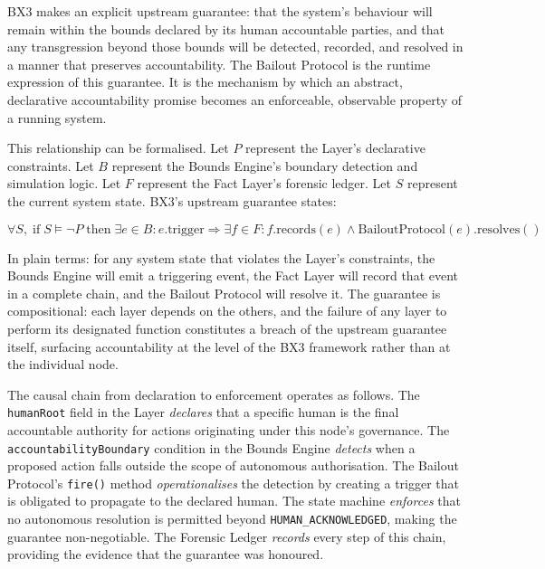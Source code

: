BX3 makes an explicit upstream guarantee: that the system's behaviour will remain within the bounds declared by its human accountable parties, and that any transgression beyond those bounds will be detected, recorded, and resolved in a manner that preserves accountability. The Bailout Protocol is the runtime expression of this guarantee. It is the mechanism by which an abstract, declarative accountability promise becomes an enforceable, observable property of a running system.

This relationship can be formalised. Let $P$ represent the \purpose{} Layer's declarative constraints. Let $B$ represent the Bounds Engine's boundary detection and simulation logic. Let $F$ represent the Fact Layer's forensic ledger. Let $S$ represent the current system state. BX3's upstream guarantee states:

\begin{equation}
    \forall S, \; \text{if} \; S \models \neg P \; \text{then} \;
    \exists e \in B : e.\text{trigger} \Rightarrow
    \exists f \in F : f.\text{records}(e) \land \text{BailoutProtocol}(e).\text{resolves}()
\end{equation}

In plain terms: for any system state that violates the \purpose{} Layer's constraints, the Bounds Engine will emit a triggering event, the Fact Layer will record that event in a complete chain, and the Bailout Protocol will resolve it. The guarantee is compositional: each layer depends on the others, and the failure of any layer to perform its designated function constitutes a breach of the upstream guarantee itself, surfacing accountability at the level of the BX3 framework rather than at the individual node.

The causal chain from declaration to enforcement operates as follows. The \texttt{humanRoot} field in the \purpose{} Layer \emph{declares} that a specific human is the final accountable authority for actions originating under this node's governance. The \texttt{accountabilityBoundary} condition in the Bounds Engine \emph{detects} when a proposed action falls outside the scope of autonomous authorisation. The Bailout Protocol's \texttt{fire()} method \emph{operationalises} the detection by creating a trigger that is obligated to propagate to the declared human. The state machine \emph{enforces} that no autonomous resolution is permitted beyond \texttt{HUMAN\_ACKNOWLEDGED}, making the guarantee non-negotiable. The Forensic Ledger \emph{records} every step of this chain, providing the evidence that the guarantee was honoured.

